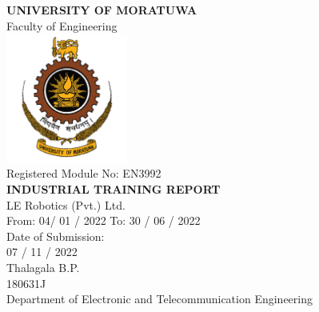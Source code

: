 \begin{titlepage}
\center %


\textbf{\large UNIVERSITY OF MORATUWA }\\[8mm]
{\large Faculty of Engineering}\\[1.5cm]
\includegraphics[width=0.3\textwidth]{figures/uomlogo}\\[1.5cm]


{\large Registered Module No: EN3992}\\[5mm]
\textbf{\large INDUSTRIAL TRAINING REPORT}\\[1cm]


{\large LE Robotics (Pvt.) Ltd.}\\[0.5cm]

{\large From: 04/ 01 / 2022 To: 30 / 06 / 2022}\\[1cm]

{\large Date of Submission:}\\[2mm]
{\large 07 / 11 / 2022} \\[1cm]

{\large Thalagala B.P.}\\[4mm]
{\large 180631J}\\[1cm]

{\large Department of Electronic and Telecommunication Engineering}


\vfill %

\end{titlepage}